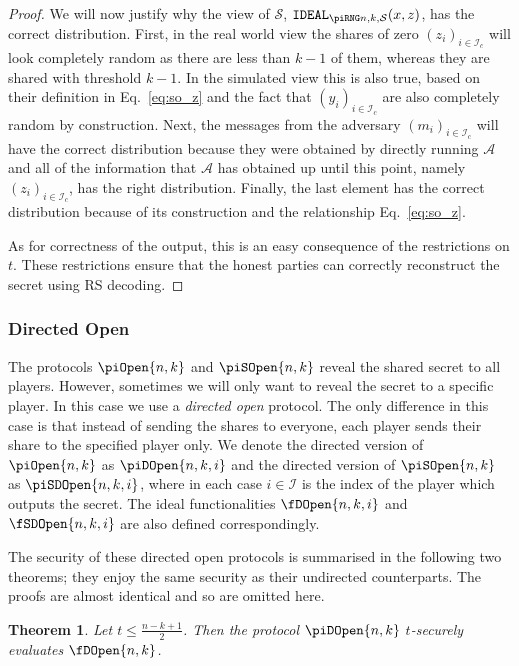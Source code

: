 \documentclass{article}
\newtheorem{theorem}{Theorem}
\theoremstyle{remark}
\begin{document}
\begin{proof}
	We will now justify why the view of $\mathcal{S}$, $\idealD$, has the
	correct distribution. First, in the real world view the shares of zero
	${(z_i)}_{i \in \mathcal{I}_c}$ will look completely random as there are
	less than $k - 1$ of them, whereas they are shared with threshold $k - 1$.
	In the simulated view this is also true, based on their definition in
	Eq.~\eqref{eq:so_z} and the fact that ${(y_i)}_{i \in \mathcal{I}_c}$ are
	also completely random by construction. Next, the messages from the
	adversary ${(m_i)}_{i \in \mathcal{I}_c}$ will have the correct
	distribution because they were obtained by directly running $\mathcal{A}$
	and all of the information that $\mathcal{A}$ has obtained up until this
	point, namely ${(z_i)}_{i \in \mathcal{I}_c}$, has the right distribution.
	Finally, the last element has the correct distribution because of its
	construction and the relationship Eq.~\eqref{eq:so_z}.

	As for correctness of the output, this is an easy consequence of the
	restrictions on $t$. These restrictions ensure that the honest parties can
	correctly reconstruct the secret using RS decoding.
\end{proof}

\subsubsection{Directed Open}

The protocols $\piOpen{n,k}$ and $\piSOpen{n,k}$ reveal the shared secret to
all players. However, sometimes we will only want to reveal the secret to a
specific player. In this case we use a \textit{directed open} protocol. The
only difference in this case is that instead of sending the shares to everyone,
each player sends their share to the specified player only. We denote the
directed version of $\piOpen{n,k}$ as $\piDOpen{n,k,i}$ and the directed
version of $\piSOpen{n,k}$ as $\piSDOpen{n,k,i}$, where in each case $i \in
\mathcal{I}$ is the index of the player which outputs the secret. The ideal
functionalities $\fDOpen{n,k,i}$ and $\fSDOpen{n,k,i}$ are also defined
correspondingly.

The security of these directed open protocols is summarised in the following
two theorems; they enjoy the same security as their undirected counterparts.
The proofs are almost identical and so are omitted here.

\begin{theorem}
	Let $t \le \frac{n - k + 1}{2}$. Then the protocol $\piDOpen{n,k}$
	$t$-securely evaluates $\fDOpen{n,k}$.
\end{theorem}
\end{document}
